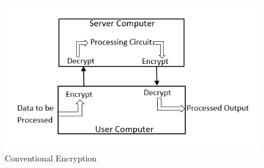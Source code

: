 \begin{figure}[!h]
\centering
\includegraphics[scale=0.7]{figures/Capture1.PNG}
\caption{Conventional Encryption}
\label{fig:Conventional Encryption}
\end{figure}